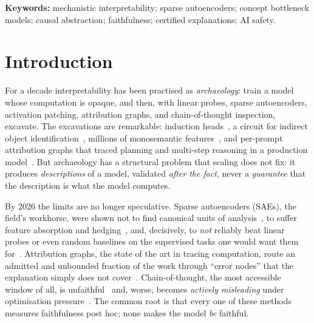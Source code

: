 \documentclass[11pt]{article}
\providecommand{\lmReconDelta}{0.10}\providecommand{\lmReconDeltaStd}{0.01}
\providecommand{\lmCandorDelta}{0.05}\providecommand{\lmCandorDeltaStd}{0.01}
\begin{document}
\begin{abstract}
fails to tighten the certificate: reconstruction and faithfulness dissociate.
Training a small language model from scratch \emph{with} its bottlenecks reverses
the picture, as the thesis predicts: on real text the full objective certifies
materially tighter than a matched reconstruction-only control
($\delta=\lmCandorDelta{}$ vs.\ \lmReconDelta{}) at no measured capability tax,
though the absolute certificate remains loose; whether by-construction training
certifies \emph{tightly} at realistic scale is the central open question. We are
explicit
about scope: these are small-scale demonstrations, and completeness is unattainable
under computation in superposition; the contribution is to make the bypass
\emph{measured, bounded, and certified}. All code and every measured number are
released.
\end{abstract}

\medskip
\noindent\textbf{Keywords:} mechanistic interpretability; sparse autoencoders;
concept bottleneck models; causal abstraction; faithfulness; certified
explanations; AI safety.

\section{Introduction}
For a decade interpretability has been practised as \emph{archaeology}: train a
model whose computation is opaque, and then, with linear probes, sparse
autoencoders, activation patching, attribution graphs, and chain-of-thought
inspection, excavate. The excavations are remarkable: induction
heads~\citep{olsson2022induction}, a circuit for indirect object
identification~\citep{wang2022ioi}, millions of monosemantic
features~\citep{templeton2024scaling}, and per-prompt attribution graphs that traced
planning and multi-step reasoning in a production model~\citep{lindsey2025biology}.
But archaeology has a structural problem that scaling does not fix: it produces
\emph{descriptions} of a model, validated \emph{after the fact}, never a
\emph{guarantee} that the description is what the model computes.

By 2026 the limits are no longer speculative. Sparse autoencoders (SAEs), the
field's workhorse, were shown not to find canonical units of
analysis~\citep{leask2025canonical}, to suffer feature absorption and
hedging~\citep{chanin2024absorption,chanin2025hedging}, and, decisively, to
\emph{not} reliably beat linear probes or even random baselines on the supervised
tasks one would want them for~\citep{kantamneni2025useful}. Attribution graphs, the
state of the art in tracing computation, route an admitted and unbounded fraction of
the work through ``error nodes'' that the explanation simply does not
cover~\citep{ameisen2025circuit}. Chain-of-thought, the most accessible window of
all, is unfaithful~\citep{turpin2023language,chen2025reasoning} and, worse, becomes
\emph{actively misleading} under optimisation
pressure~\citep{baker2025monitoring,korbak2025cot}. The common root is that every one
of these methods measures faithfulness post hoc; none makes the model \emph{be}
faithful.
\end{document}
